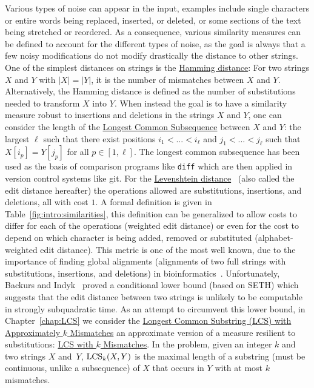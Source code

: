 Various types of noise can appear in the input, examples include single characters or entire words being replaced, inserted, or deleted, or some sections of the text being stretched or reordered. As a consequence, various similarity measures can be defined to account for the different types of noise, as the goal is always that a few noisy modifications do not modify drastically the distance to other strings.
One of the simplest distances on strings is the \underline{Hamming distance}: For two strings $X$ and $Y$ with $|X|=|Y|$, it is the number of mismatches between $X$ and $Y$. Alternatively, the Hamming distance is defined as the number of substitutions needed to transform $X$ into $Y$.
When instead the goal is to have a similarity measure robust to insertions and deletions in the strings $X$ and $Y$, one can consider the length of the \underline{Longest Common Subsequence} between $X$ and $Y$: the largest $\ell$ such that there exist positions $i_1<... < i_\ell$ and $j_1< ... < j_\ell$ such that $X[i_p] = Y[j_p]$ for all $p \in [1,\ell]$. The longest common subsequence has been used as the basis of comparison programs like \texttt{diff} which are then applied in version control systems like git.
For the \underline{Levenshtein distance}~\cite{levenshtein1966binary} (also called the edit distance hereafter) the operations allowed are substitutions, insertions, and deletions, all with cost $1$. A formal definition is given in Table~\ref{fig:intro:similarities}, this definition can be generalized to allow costs to differ for each of the operations (weighted edit distance) or even for the cost to depend on which character is being added, removed or substituted (alphabet-weighted edit distance). This metric is one of the most well known, due to the importance of finding global alignments (alignments of two full strings with substitutions, insertions, and deletions) in bioinformatics~\cite{Gusfield1997}.
Unfortunately, Backurs and Indyk~\cite{DBLP:conf/stoc/BackursI15} proved a conditional lower bound (based on SETH) which suggests that the edit distance between two strings is unlikely to be computable in strongly subquadratic time.
As an attempt to circumvent this lower bound, in Chapter~\ref{chap:LCS} we consider the \underline{Longest Common Substring (LCS) with Approximately $k$ Mismatches} an approximate version of a measure resilient to substitutions: \underline{LCS with $k$ Mismatches}. In the \kLCS problem, given an integer $k$ and two strings $X$ and~$Y$, $\mathrm{LCS}_{k}(X,Y)$ is the maximal length of a substring (must be continuous, unlike a subsequence) of $X$ that occurs in $Y$ with at most $k$ mismatches. 
